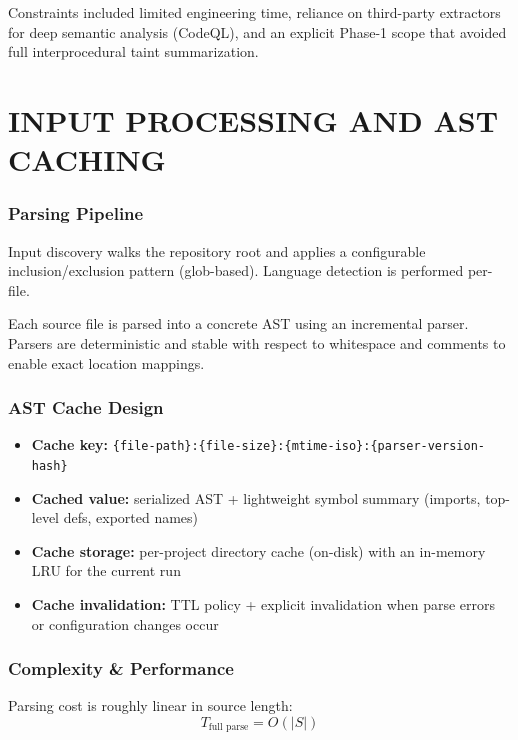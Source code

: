 Constraints included limited engineering time, reliance on third-party extractors for deep semantic analysis (CodeQL), and an explicit Phase-1 scope that avoided full interprocedural taint summarization.

\section{\uppercase{Input Processing and AST Caching}}

\subsubsection{Parsing Pipeline}

Input discovery walks the repository root and applies a configurable inclusion/exclusion pattern (glob-based). Language detection is performed per-file.

Each source file is parsed into a concrete AST using an incremental parser. Parsers are deterministic and stable with respect to whitespace and comments to enable exact location mappings.

\subsubsection{AST Cache Design}

\begin{itemize}
    \item \textbf{Cache key:} \texttt{\{file-path\}:\{file-size\}:\{mtime-iso\}:\{parser-version-hash\}}
    \item \textbf{Cached value:} serialized AST + lightweight symbol summary (imports, top-level defs, exported names)
    \item \textbf{Cache storage:} per-project directory cache (on-disk) with an in-memory LRU for the current run
    \item \textbf{Cache invalidation:} TTL policy + explicit invalidation when parse errors or configuration changes occur
\end{itemize}

\subsubsection{Complexity \& Performance}

Parsing cost is roughly linear in source length:
\begin{equation}
T_{\text{full parse}} = O(|S|)
\label{eq:full_parse}
\end{equation}

